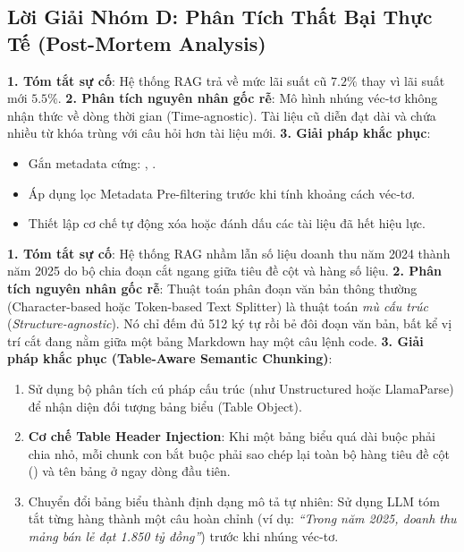\subsection{Lời Giải Nhóm D: Phân Tích Thất Bại Thực Tế (Post-Mortem Analysis)}

\begin{debugbox}
\textbf{1. Tóm tắt sự cố}: Hệ thống RAG trả về mức lãi suất cũ $7.2\%$ thay vì lãi suất mới $5.5\%$.
\textbf{2. Phân tích nguyên nhân gốc rễ}: Mô hình nhúng véc-tơ không nhận thức về dòng thời gian (Time-agnostic). Tài liệu cũ diễn đạt dài và chứa nhiều từ khóa trùng với câu hỏi hơn tài liệu mới.
\textbf{3. Giải pháp khắc phục}:
\begin{itemize}
  \item Gắn metadata cứng: , .
  \item Áp dụng lọc Metadata Pre-filtering trước khi tính khoảng cách véc-tơ.
  \item Thiết lập cơ chế tự động xóa hoặc đánh dấu  các tài liệu đã hết hiệu lực.
\end{itemize}
\end{debugbox}

\begin{debugbox}
\textbf{1. Tóm tắt sự cố}: Hệ thống RAG nhầm lẫn số liệu doanh thu năm 2024 thành năm 2025 do bộ chia đoạn cắt ngang giữa tiêu đề cột và hàng số liệu.
\textbf{2. Phân tích nguyên nhân gốc rễ}:
Thuật toán phân đoạn văn bản thông thường (Character-based hoặc Token-based Text Splitter) là thuật toán \textit{mù cấu trúc} (\textit{Structure-agnostic}). Nó chỉ đếm đủ 512 ký tự rồi bẻ đôi đoạn văn bản, bất kể vị trí cắt đang nằm giữa một bảng Markdown hay một câu lệnh code.
\textbf{3. Giải pháp khắc phục (Table-Aware Semantic Chunking)}:
\begin{enumerate}
  \item Sử dụng bộ phân tích cú pháp cấu trúc (như Unstructured hoặc LlamaParse) để nhận diện đối tượng bảng biểu (Table Object).
  \item \textbf{Cơ chế Table Header Injection}: Khi một bảng biểu quá dài buộc phải chia nhỏ, mỗi chunk con bắt buộc phải sao chép lại toàn bộ hàng tiêu đề cột () và tên bảng ở ngay dòng đầu tiên.
  \item Chuyển đổi bảng biểu thành định dạng mô tả tự nhiên: Sử dụng LLM tóm tắt từng hàng thành một câu hoàn chỉnh (ví dụ: \textit{``Trong năm 2025, doanh thu mảng bán lẻ đạt 1.850 tỷ đồng''}) trước khi nhúng véc-tơ.
\end{enumerate}
\end{debugbox}

